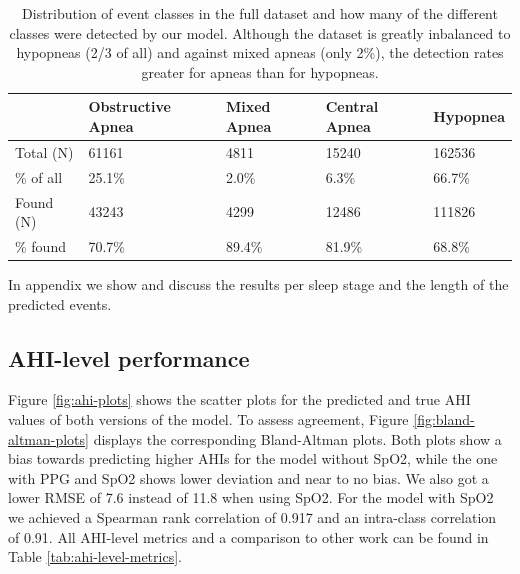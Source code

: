 \renewcommand{\arraystretch}{1.5}
\begin{table}
    \centering
    \begin{tabular}{ l p{2cm} p{2cm} p{2cm} p{2cm} }
        & Obstructive \newline Apnea & Mixed \newline Apnea & Central \newline Apnea & Hypopnea \\
        \hline
        Total (N) & 61161 & 4811 & 15240 & 162536 \\
        \% of all & 25.1\% & 2.0\% & 6.3\%  &  66.7\% \\
        \hline
        Found (N) & 43243 & 4299 & 12486 & 111826 \\
        \% found & 70.7\% & 89.4\% & 81.9\% & 68.8\% \\
    \end{tabular}
    \caption{Distribution of event classes in the full dataset and how many of the different classes were detected by our model. Although the dataset is greatly inbalanced to hypopneas (2/3 of all) and against mixed apneas (only 2\%), the detection rates greater for apneas than for hypopneas. \label{tab:event-class-distribution}}
\end{table}

In appendix  we show and discuss the results per sleep stage and the length of the predicted events.

\subsection*{AHI-level performance}

Figure \ref{fig:ahi-plots} shows the scatter plots for the predicted and true AHI values of both versions of the model. To assess agreement, Figure \ref{fig:bland-altman-plots} displays the corresponding Bland-Altman plots. Both plots show a bias towards predicting higher AHIs for the model without SpO2, while the one with PPG and SpO2 shows lower deviation and near to no bias. We also got a lower RMSE of 7.6 instead of 11.8 when using SpO2.
For the model with SpO2 we achieved a Spearman rank correlation of 0.917 and an intra-class correlation of  0.91.
All AHI-level metrics and a comparison to other work can be found in Table \ref{tab:ahi-level-metrics}.

